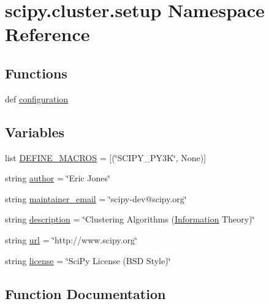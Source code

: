 \hypertarget{namespacescipy_1_1cluster_1_1setup}{}\section{scipy.\+cluster.\+setup Namespace Reference}
\label{namespacescipy_1_1cluster_1_1setup}
\subsection*{Functions}
\begin{DoxyCompactItemize}
\item 
def \hyperlink{namespacescipy_1_1cluster_1_1setup_a9a4036494fd2cb2f8a33087b13f538d1}{configuration}
\end{DoxyCompactItemize}
\subsection*{Variables}
\begin{DoxyCompactItemize}
\item 
list \hyperlink{namespacescipy_1_1cluster_1_1setup_a49d3aea3fdae8f53218699cf2ef09892}{D\+E\+F\+I\+N\+E\+\_\+\+M\+A\+C\+R\+O\+S} = \mbox{[}(\char`\"{}S\+C\+I\+P\+Y\+\_\+\+P\+Y3\+K\char`\"{}, None)\mbox{]}
\item 
string \hyperlink{namespacescipy_1_1cluster_1_1setup_a33bb7384cc6e48f12d23573fd45709e3}{author} = \char`\"{}Eric Jones\char`\"{}
\item 
string \hyperlink{namespacescipy_1_1cluster_1_1setup_a34dd09f4e5cb0046db41763ae69caab2}{maintainer\+\_\+email} = \char`\"{}scipy-\/dev@scipy.\+org\char`\"{}
\item 
string \hyperlink{namespacescipy_1_1cluster_1_1setup_afbe9aabb851c1560329f84cb7e4d6c08}{description} = \char`\"{}Clustering Algorithms (\hyperlink{sparse_2linalg_2eigen_2arpack_2ARPACK_2SRC_2stat_8h_a67091df4e8abc54c6f3c19ef79b555f0}{Information} Theory)\char`\"{}
\item 
string \hyperlink{namespacescipy_1_1cluster_1_1setup_ad1dc45c1949a63588a6ed87705caf00f}{url} = \char`\"{}http\+://www.\+scipy.\+org\char`\"{}
\item 
string \hyperlink{namespacescipy_1_1cluster_1_1setup_a7178ce4c13b952f048081ada27247ba4}{license} = \char`\"{}Sci\+Py License (B\+S\+D Style)\char`\"{}
\end{DoxyCompactItemize}


\subsection{Function Documentation}
\hypertarget{namespacescipy_1_1cluster_1_1setup_a9a4036494fd2cb2f8a33087b13f538d1}{}
